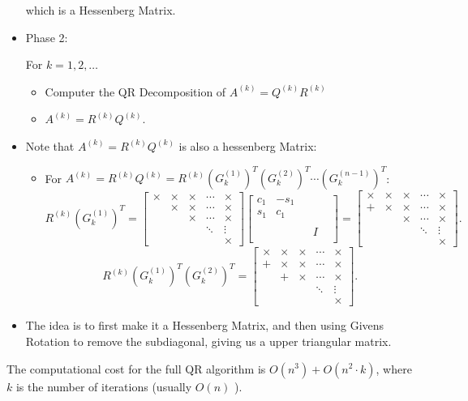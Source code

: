 \documentclass[../main/main.tex]{subfiles}
\begin{document}
\begin{itemize}
\[\] which is a Hessenberg Matrix. 
\item Phase 2: 
	\begin{algo} For $k=1,2,\ldots$ 
		\begin{itemize}
			\item Computer the QR Decomposition of $A^{(k)}=Q^{(k)}R^{(k)}$ 
			\item $A^{(k)}=R^{(k)}Q^{(k)}$.
		\end{itemize}
	\end{algo}
\item Note that $A^{(k)}=R^{(k)}Q^{(k)}$ is also a hessenberg Matrix:
	\begin{itemize}
\item For $A^{(k)}=R^{(k)}Q^{(k)}=R^{(k)}\left( G_k^{(1)} \right)^{T}\left( G_k^{(2)} \right)^{T} \cdots\left( G_k^{(n-1)} \right)^{T}$: \[
		R^{(k)}\left( G_k^{(1)} \right) ^{T}= \begin{bmatrix} \times &\times &\times &\cdots&\times \\&\times &\times &\cdots&\times \\ &&\times &\cdots&\times \\&&&\ddots &\vdots\\&&&&\times  \end{bmatrix} \begin{bmatrix} c_1&-s_1&&&\\ s_1 & c_1 &&&\\ &&&&\\&&&I&\\&&&& \end{bmatrix} = \begin{bmatrix} \times &\times &\times &\cdots&\times \\ +&\times &\times &\cdots&\times \\ &&\times &\cdots&\times \\&&&\ddots &\vdots\\&&&&\times  \end{bmatrix} 
.\] \[
R^{(k)}\left( G_k^{(1)} \right) ^{T}\left( G_k^{(2)} \right) ^{T}=
\begin{bmatrix} \times &\times &\times &\cdots&\times \\ +&\times &\times &\cdots&\times \\ &+&\times &\cdots&\times \\&&&\ddots &\vdots\\&&&&\times  \end{bmatrix} 
.\] 
	\end{itemize}
\item The idea is to first make it a Hessenberg Matrix, and then using Givens Rotation to remove the subdiagonal, giving us a upper triangular matrix.
\end{itemize}
The computational cost for the full QR algorithm is $O(n^{3})+O(n^2\cdot k)$, where $k$ is the number of iterations (usually $O(n)$ ).\\
\end{document}
